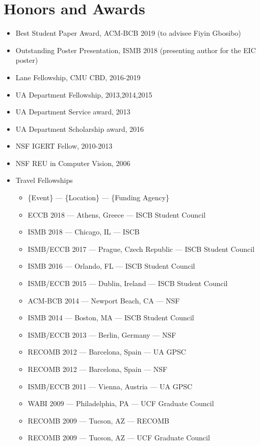 \documentclass[10pt,letterpaper]{article}
\begin{document}
\section*{Honors and Awards}

\begin{itemize}
    \item Best Student Paper Award, ACM-BCB 2019 (to advisee Fiyin Gbosibo)
    \item Outstanding Poster Presentation, ISMB 2018 (presenting author for the EIC poster)
    \item Lane Fellowship, CMU CBD, 2016-2019
    \item UA Department Fellowship, 2013,2014,2015
    \item UA Department Service award, 2013
    \item UA Department Scholarship award, 2016
    \item NSF IGERT Fellow, 2010-2013
    \item NSF REU in Computer Vision, 2006
    \item Travel Fellowships
    \begin{itemize}
    	\item \{Event\} --- \{Location\} --- \{Funding Agency\}
    	\item ECCB 2018 --- Athens, Greece --- ISCB Student Council
    	\item ISMB 2018 --- Chicago, IL --- ISCB
	\item ISMB/ECCB 2017 --- Prague, Czech Republic --- ISCB Student Council 
	\item ISMB 2016 --- Orlando, FL --- ISCB Student Council
	\item ISMB/ECCB 2015 --- Dublin, Ireland --- ISCB Student Council
	\item ACM-BCB 2014 --- Newport Beach, CA --- NSF
	\item ISMB 2014 --- Boston, MA --- ISCB Student Council 
	\item ISMB/ECCB 2013 --- Berlin, Germany --- NSF
	\item RECOMB 2012 --- Barcelona, Spain --- UA GPSC
	\item RECOMB 2012 --- Barcelona, Spain --- NSF
	\item ISMB/ECCB 2011 --- Vienna, Austria --- UA GPSC
	\item WABI 2009 --- Philadelphia, PA --- UCF Graduate Council 
	\item RECOMB 2009 --- Tucson, AZ --- RECOMB
	\item RECOMB 2009 --- Tucson, AZ --- UCF Graduate Council
    \end{itemize}
\end{itemize}
\end{document}

